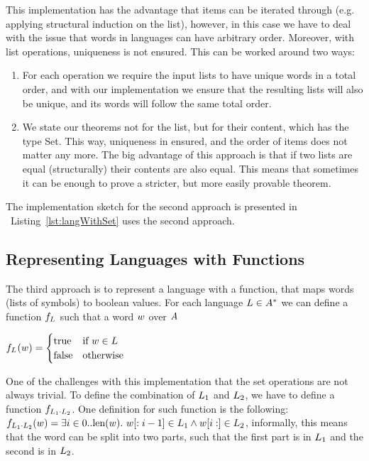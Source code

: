 This implementation has the advantage that items can be iterated through (e.g. applying structural induction on the list), however, in this case we have to deal with the issue that words in languages can have arbitrary order. Moreover, with list operations, uniqueness is not ensured. This can be worked around two ways:
\begin{enumerate}
	\item For each operation we require the input lists to have unique words in a total order, and with our implementation we ensure that the resulting lists will also be unique, and its words will follow the same total order.
	
	\item We state our theorems not for the list, but for their content, which has the type Set. This way, uniqueness in ensured, and the order of items does not matter any more. The big advantage of this approach is that if two lists are equal (structurally) their contents are also equal. This means that sometimes it can be enough to prove a stricter, but more easily provable theorem.
\end{enumerate}

The implementation sketch for the second approach is presented in ~Listing~\ref{lst:langWithSet} uses the second approach.

\subsection{Representing Languages with Functions}

The third approach is to represent a language with a function, that maps words (lists of symbols) to boolean values. For each language $L \in A^{*}$ we can define a function $f_{L_{}}$ such that a word $w$ over $A$

$
f_{L_{}}(w)= 
\begin{cases}
\text{true}& \text{if } w \in L\\
\text{false}              & \text{otherwise}
\end{cases}
$

One of the challenges with this implementation that the set operations are not always trivial. To define the combination of $L_{1}$ and $L_{2}$, we have to define a function $f_{L_{1} \cdot L_{2}}$. One definition for such function is the following: $f_{L_{1} \cdot L_{2}}(w) = \exists i \in 0..\text{len}(w). ~ w[:i-1] \in L_{1} \wedge w[i:] \in L_{2} $, informally, this means that the word can be split into two parts, such that the first part is in $L_{1}$ and the second is in $L_{2}$.

